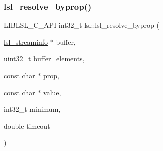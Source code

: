 \subsubsection{\texorpdfstring{lsl\+\_\+resolve\+\_\+byprop()}{lsl\_resolve\_byprop()}}
{\footnotesize\ttfamily L\+I\+B\+L\+S\+L\+\_\+\+C\+\_\+\+A\+PI int32\+\_\+t lsl\+::lsl\+\_\+resolve\+\_\+byprop (\begin{DoxyParamCaption}\item[{\hyperlink{namespacelsl_aa0a9ce9956061679949daa2e35aae2e8}{lsl\+\_\+streaminfo} $\ast$}]{buffer,  }\item[{uint32\+\_\+t}]{buffer\+\_\+elements,  }\item[{const char $\ast$}]{prop,  }\item[{const char $\ast$}]{value,  }\item[{int32\+\_\+t}]{minimum,  }\item[{double}]{timeout }\end{DoxyParamCaption})}

